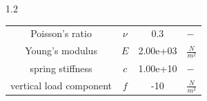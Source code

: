 \documentclass[preview]{standalone}
\begin{document}
\begin{spacing}{1.2}
\begin{tabular}{cccl}
\toprule
Poisson's ratio & $\nu$ & 0.3 & $-$ \\ 
Young's modulus & $E$ & 2.00e+03 & $\frac{N}{m^2}$ \\ 
spring stiffness & $c$ & 1.00e+10 & $-$ \\ 
vertical load component & $f$ & -10 & $\frac{N}{m^2}$ \\ 
\bottomrule
\end{tabular}
\end{spacing}
\end{document}
